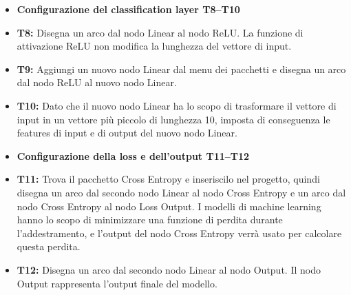 \documentclass[10pt,a4paper]{article}
\newcommand{\taskgroup}[2]{%
    \item[] {\color{groupcolor}\small\bfseries
    #1 \hfill \normalfont\footnotesize #2}%
}
\begin{document}
\begin{minipage}[t]{0.48\textwidth}
\begin{itemize}
    \taskgroup{Configurazione del classification layer}{T8--T10}

    \item \textbf{T8:} Disegna un arco dal nodo Linear al nodo ReLU. La funzione di attivazione ReLU non modifica la lunghezza del vettore di input.

    \item \textbf{T9:} Aggiungi un nuovo nodo Linear dal menu dei pacchetti e disegna un arco dal nodo ReLU al nuovo nodo Linear.

    \item \textbf{T10:} Dato che il nuovo nodo Linear ha lo scopo di trasformare il vettore di input in un vettore più piccolo di lunghezza 10, imposta di conseguenza le features di input e di output del nuovo nodo Linear.

    \taskgroup{Configurazione della loss e dell'output}{T11--T12}

    \item \textbf{T11:} Trova il pacchetto Cross Entropy e inseriscilo nel progetto, quindi disegna un arco dal secondo nodo Linear al nodo Cross Entropy e un arco dal nodo Cross Entropy al nodo Loss Output. I modelli di machine learning hanno lo scopo di minimizzare una funzione di perdita durante l'addestramento, e l'output del nodo Cross Entropy verrà usato per calcolare questa perdita.

    \item \textbf{T12:} Disegna un arco dal secondo nodo Linear al nodo Output. Il nodo Output rappresenta l'output finale del modello.
\end{itemize}

\end{minipage}
\end{document}
